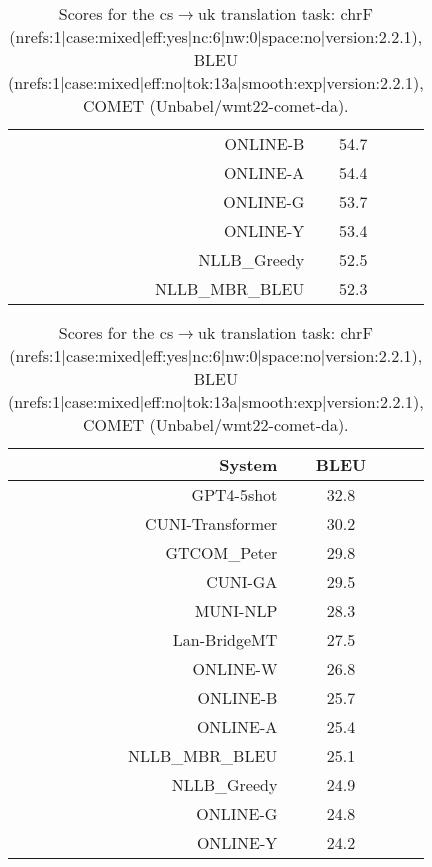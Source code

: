 \documentclass[11pt]{article}
\begin{document}
\begin{table}[]
\begin{subtable}[t]{0.33\textwidth}
\begin{tabular}{rcc}
\rowcolor{ashgrey} ONLINE-B   & 54.7 \\ 
\rowcolor{ashgrey} ONLINE-A   & 54.4 \\ 
\rowcolor{ashgrey} ONLINE-G   & 53.7 \\ 
\rowcolor{ashgrey} ONLINE-Y  & 53.4 \\ 
\rowcolor{ashgrey} NLLB\_Greedy   & 52.5 \\ 
\rowcolor{ashgrey} NLLB\_MBR\_BLEU   & 52.3 \\ 
\bottomrule 
\end{tabular} 
\end{subtable} 
\begin{subtable}[t]{0.33\textwidth}
\begin{tabular}{rcc}
\toprule 
System  & BLEU \\ 
\midrule 
\rowcolor{ashgrey} GPT4-5shot   & 32.8 \\ 
CUNI-Transformer  & 30.2 \\ 
\rowcolor{ashgrey} GTCOM\_Peter   & 29.8 \\ 
CUNI-GA  & 29.5 \\ 
MUNI-NLP  & 28.3 \\ 
\rowcolor{ashgrey} Lan-BridgeMT   & 27.5 \\ 
\rowcolor{ashgrey} ONLINE-W   & 26.8 \\ 
\rowcolor{ashgrey} ONLINE-B   & 25.7 \\ 
\rowcolor{ashgrey} ONLINE-A   & 25.4 \\ 
\rowcolor{ashgrey} NLLB\_MBR\_BLEU   & 25.1 \\ 
\rowcolor{ashgrey} NLLB\_Greedy   & 24.9 \\ 
\rowcolor{ashgrey} ONLINE-G   & 24.8 \\ 
\rowcolor{ashgrey} ONLINE-Y   & 24.2 \\ 
\bottomrule 
\end{tabular} 
\end{subtable} 
 
\caption{Scores for the cs$\rightarrow$uk translation task: chrF (nrefs:1|case:mixed|eff:yes|nc:6|nw:0|space:no|version:2.2.1), BLEU (nrefs:1|case:mixed|eff:no|tok:13a|smooth:exp|version:2.2.1), COMET (Unbabel/wmt22-comet-da).} 
\end{table} 
\end{document}
